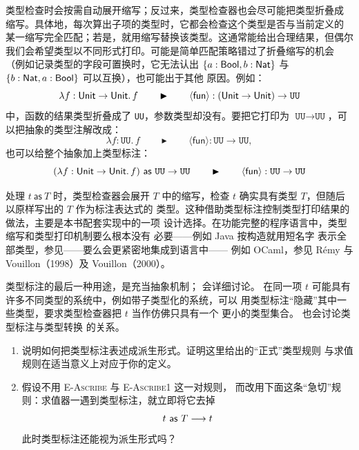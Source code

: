 类型检查时会按需自动展开缩写；反过来，类型检查器也会尽可能把类型折叠成
缩写。具体地，每次算出子项的类型时，它都会检查这个类型是否与当前定义的
某一缩写完全匹配；若是，就用缩写替换该类型。这通常能给出合理结果，但偶尔
我们会希望类型以不同形式打印。可能是简单匹配策略错过了折叠缩写的机会
（例如记录类型的字段可置换时，它无法认出
\(\{a:\mathsf{Bool},b:\mathsf{Nat}\}\) 与
\(\{b:\mathsf{Nat},a:\mathsf{Bool}\}\) 可以互换），也可能出于其他
原因。例如：
\[
\lambda f:\mathsf{Unit}\to\mathsf{Unit}.\,f
\qquad\blacktriangleright\qquad
\langle\mathsf{fun}\rangle:
(\mathsf{Unit}\to\mathsf{Unit})\to\texttt{UU}
\]
中，函数的结果类型折叠成了 \texttt{UU}，参数类型却没有。要把它打印为
\(\texttt{UU}\to\texttt{UU}\)，可以把抽象的类型注解改成：
\[
\lambda f:\texttt{UU}.\,f
\qquad\blacktriangleright\qquad
\langle\mathsf{fun}\rangle:\texttt{UU}\to\texttt{UU},
\]
也可以给整个抽象加上类型标注：
\[
(\lambda f:\mathsf{Unit}\to\mathsf{Unit}.\,f)
\ \mathsf{as}\ \texttt{UU}\to\texttt{UU}
\qquad\blacktriangleright\qquad
\langle\mathsf{fun}\rangle:\texttt{UU}\to\texttt{UU}
\]

处理 \(t\ \mathsf{as}\ T\) 时，类型检查器会展开 \(T\) 中的缩写，检查
\(t\) 确实具有类型 \(T\)，但随后以原样写出的 \(T\) 作为标注表达式的
类型。这种借助类型标注控制类型打印结果的做法，主要是本书配套实现中的一项
设计选择。在功能完整的程序语言中，类型缩写和类型打印机制要么根本没有
必要——例如 Java 按构造就用短名字
表示全部类型，参见——要么会更紧密地集成到语言中——
例如 OCaml，参见 Rémy 与 Vouillon（1998）及 Vouillon（2000）。

类型标注的最后一种用途，是充当抽象机制；
 会详细讨论。
在同一项 \(t\) 可能具有许多不同类型的系统中，例如带子类型化的系统，可以
用类型标注“隐藏”其中一些类型，要求类型检查器把 \(t\) 当作仿佛只具有一个
更小的类型集合。 也会讨论类型标注与类型转换
的关系。

\begin{exercise}
\label{ex:11.4.1}
\begin{enumerate}
  \item 说明如何把类型标注表述成派生形式。证明这里给出的“正式”类型规则
    与求值规则在适当意义上对应于你的定义。
  \item 假设不用 \textsc{E-Ascribe} 与 \textsc{E-Ascribe1} 这一对规则，
    而改用下面这条“急切”规则：求值器一遇到类型标注，就立即将它去掉
    \[
      t\ \mathsf{as}\ T\mathrel{\longrightarrow} t
    \]
    此时类型标注还能视为派生形式吗？
\end{enumerate}
\end{exercise}

